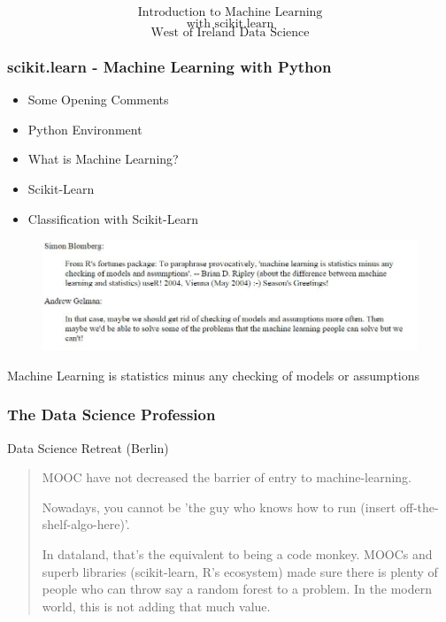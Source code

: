 \documentclass{beamer}
\begin{document}
\begin{frame}
	\huge
	
	\[\mbox{Introduction to Machine Learning} \]
	\[\mbox{with scikit.learn}\]
	\bigskip
	\[ \mbox{West of Ireland Data Science} \]
\end{frame}
\begin{frame}[fragile]
	\frametitle{scikit.learn - Machine Learning with Python}
	\LARGE
	\begin{itemize}
		\item Some Opening Comments
		\item Python Environment
		\item What is Machine Learning?
		\item Scikit-Learn
		\item Classification with Scikit-Learn
	\end{itemize}
	
\end{frame}




\begin{frame}
	\begin{figure}
		\centering
		\includegraphics[width=1.1\linewidth]{machinelearningquotes}
	\end{figure}
	\Large Machine Learning is statistics minus any checking of models or assumptions
\end{frame}
\begin{frame}
	\frametitle{The Data Science Profession}
	Data Science Retreat (Berlin)
	\begin{quote}
		MOOC have not  decreased the barrier of entry to machine-learning.
		
		
		Nowadays, you cannot be 'the guy who knows how to run (insert off-the-shelf-algo-here)'. 
		
		
		In dataland, that's the equivalent to being a code monkey. MOOCs and superb libraries (scikit-learn, R's ecosystem) made 
		sure there is plenty of people who can throw say a random forest to a problem. In the modern world, this is not adding that much value. 
	\end{quote}
\end{frame}
\end{document}
